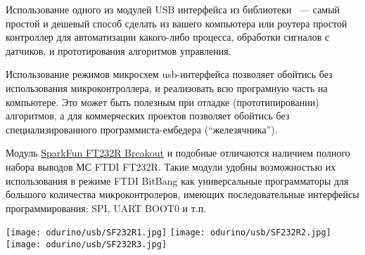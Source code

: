 \secdown

Использование одного из модулей USB интерфейса из библиотеки \odurino\ --- самый
простой и дешевый способ сделать из вашего компьютера или роутера простой 
контроллер для автоматизации какого-либо процесса, обработки сигналов с
датчиков, и прототирования алгоритмов управления.

Использование  режимов микросхем usb-интерфейса
позволяет обойтись без использования микроконтроллера, и реализовать всю
програмную часть на компьютере. Это может быть полезным при отладке
(прототипировании) алгоритмов, а для коммерческих проектов позволяет обойтись
без специализированного программиста-ембедера (``железячника'').

\label{HEXFT2232RL}

Модуль \href{https://www.sparkfun.com/products/retired/718}{SparkFun FT232R
Breakout} и подобные отличаются наличием полного набора выводов МС FTDI FT232R.
Такие модули удобны возможностью их использования в режиме FTDI BitBang как
универсальные программаторы для большого количества микроконтролеров, имеющих
последовательные интерфейсы программирования: SPI, UART BOOT0 и т.п.

\texttt{[image: odurino/usb/SF232R1.jpg]}
\texttt{[image: odurino/usb/SF232R2.jpg]}
\texttt{[image: odurino/usb/SF232R3.jpg]}

\secup
